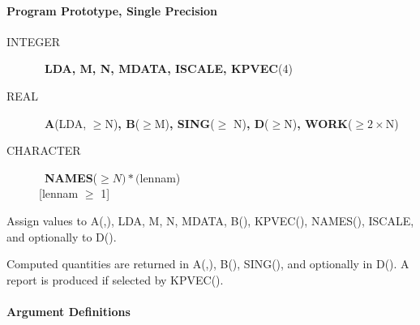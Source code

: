 \documentclass[twoside]{MATH77}
\begin{document}
\paragraph{Program Prototype, Single Precision}

\begin{description}
\item[INTEGER]  \ {\bf LDA, M, N, MDATA, ISCALE, KPVEC}(4)

\item[REAL]  \ {\bf A}(LDA, $\geq $N){\bf , B}($\geq $M){\bf , SING}($\geq $%
N){\bf , D}($\geq $N){\bf , WORK}($\geq 2 \times \text{N}$)

\item[CHARACTER]  \ {\bf NAMES}($\geq N)*($lennam)\\
{}[lennam $\geq $ 1]
\end{description}

Assign values to A(,), LDA, M, N, MDATA, B(), KPVEC(), NAMES(), ISCALE, and
optionally to D().

\begin{center}
\end{center}

Computed quantities are returned in A(,), B(), SING(), and optionally in
D(). A report is produced if selected by KPVEC().

\paragraph{Argument Definitions}
\end{document}
